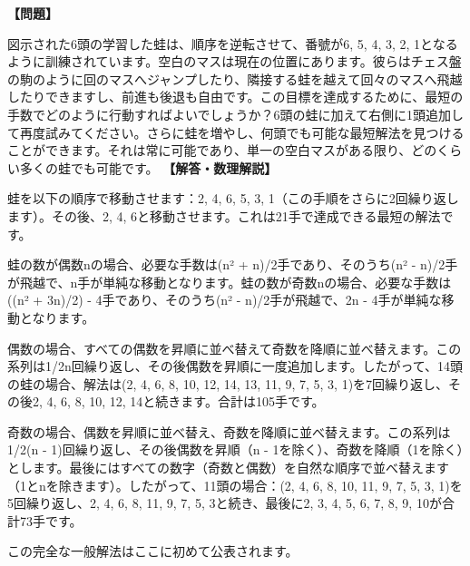 \documentclass[10pt,a4paper,oneside,openany]{ltjsbook}
\begin{document}
\begin{tcolorbox}[colback=softblue,colframe=primaryblue,title=\textbf{第 214 問：六頭の蛙 （原題: THE SIX FROGS.）},arc=2mm,boxrule=1pt,breakable]
\textbf{【問題】}\par\vspace{0.3em}
図示された6頭の学習した蛙は、順序を逆転させて、番號が6, 5, 4, 3, 2, 1となるように訓練されています。空白のマスは現在の位置にあります。彼らはチェス盤の駒のように回のマスへジャンプしたり、隣接する蛙を越えて回々のマスへ飛越したりできますし、前進も後退も自由です。この目標を達成するために、最短の手数でどのように行動すればよいでしょうか？6頭の蛙に加えて右側に1頭追加して再度試みてください。さらに蛙を増やし、何頭でも可能な最短解法を見つけることができます。それは常に可能であり、単一の空白マスがある限り、どのくらい多くの蛙でも可能です。
\tcblower
\textbf{【解答・数理解説】}\par\vspace{0.3em}
蛙を以下の順序で移動させます：2, 4, 6, 5, 3, 1（この手順をさらに2回繰り返します）。その後、2, 4, 6と移動させます。これは21手で達成できる最短の解法です。

蛙の数が偶数nの場合、必要な手数は(n² + n)/2手であり、そのうち(n² - n)/2手が飛越で、n手が単純な移動となります。蛙の数が奇数nの場合、必要な手数は((n² + 3n)/2) - 4手であり、そのうち(n² - n)/2手が飛越で、2n - 4手が単純な移動となります。

偶数の場合、すべての偶数を昇順に並べ替えて奇数を降順に並べ替えます。この系列は1/2n回繰り返し、その後偶数を昇順に一度追加します。したがって、14頭の蛙の場合、解法は(2, 4, 6, 8, 10, 12, 14, 13, 11, 9, 7, 5, 3, 1)を7回繰り返し、その後2, 4, 6, 8, 10, 12, 14と続きます。合計は105手です。

奇数の場合、偶数を昇順に並べ替え、奇数を降順に並べ替えます。この系列は1/2(n - 1)回繰り返し、その後偶数を昇順（n - 1を除く）、奇数を降順（1を除く）とします。最後にはすべての数字（奇数と偶数）を自然な順序で並べ替えます（1とnを除きます）。したがって、11頭の場合：(2, 4, 6, 8, 10, 11, 9, 7, 5, 3, 1)を5回繰り返し、2, 4, 6, 8, 11, 9, 7, 5, 3と続き、最後に2, 3, 4, 5, 6, 7, 8, 9, 10が合計73手です。

この完全な一般解法はここに初めて公表されます。
\end{tcolorbox}
\end{document}
